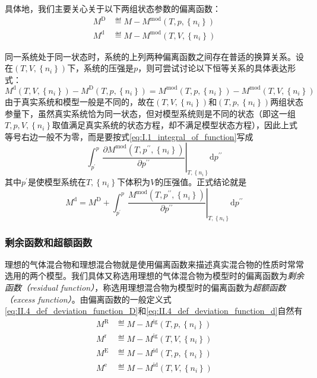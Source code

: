 \documentclass[main.tex]{subfiles}
\begin{document}
具体地，我们主要关心关于以下两组状态参数的偏离函数：
\begin{align}
  M^\text{D} & \eqdef M-M^\text{mod}\left(T,p,\left\{n_i\right\}\right)\label{eq:II.4_def_deviation_function_D} \\
  M^\text{d} & \eqdef M-M^\text{mod}\left(T,V,\left\{n_i\right\}\right)\label{eq:II.4_def_deviation_function_d}
\end{align}

同一系统处于同一状态时，系统的上列两种偏离函数之间存在普适的换算关系。设在$\left(T,V,\left\{n_i\right\}\right)$下，系统的压强是$p$，则可尝试讨论以下恒等关系的具体表达形式：
\[M^\text{d}\left(T,V,\left\{n_i\right\}\right)-M^\text{D}\left(T,p,\left\{n_i\right\}\right)=M^\text{mod}\left(T,p,\left\{n_i\right\}\right)-M^\text{mod}\left(T,V,\left\{n_i\right\}\right)\]
由于真实系统和模型一般是不同的，故在$\left(T,V,\left\{n_i\right\}\right)$和$\left(T,p,\left\{n_i\right\}\right)$两组状态参量下，虽然真实系统恰为同一状态，但对模型系统则是不同的状态（即这一组$T,p,V,\left\{n_i\right\}$取值满足真实系统的状态方程，却不满足模型状态方程），因此上式等号右边一般不为零，而是要按式\eqref{eq:I.1_integral_of_function}写成
\[\int_{p^\prime}^p\left.\frac{\partial M^\text{mod}\left(T,p^{\prime\prime},\left\{n_i\right\}\right)}{\partial p^{\prime\prime}}\right|_{T,\left\{n_i\right\}}\mathrm{d}p^{\prime\prime}\]
其中$p^\prime$是使模型系统在$T,\left\{n_i\right\}$下体积为$V$的压强值。正式结论就是
\begin{equation}\label{eq:II.4_deviation_function_relation}
  M^\text{d}=M^\text{D}+\int_{p^\prime}^p\left.\frac{M^\text{mod}\left(T,p^{\prime\prime},\left\{n_i\right\}\right)}{\partial p^{\prime\prime}}\right|_{T,\left\{n_i\right\}}\mathrm{d}p^{\prime\prime}
\end{equation}

\subsubsection{剩余函数和超额函数}
理想的气体混合物和理想混合物就是使用偏离函数来描述真实混合物的性质时常常选用的两个模型。我们具体又称选用理想的气体混合物为模型时的偏离函数为\emph{剩余函数（residual function）}，称选用理想混合物为模型时的偏离函数为\emph{超额函数（excess function）}。由偏离函数的一般定义式\eqref{eq:II.4_def_deviation_function_D}和\eqref{eq:II.4_def_deviation_function_d}自然有
\begin{align}
  M^\text{R} & \eqdef M-M^\text{ig}\left(T,p,\left\{n_i\right\}\right) \\
  M^\text{r} & \eqdef M-M^\text{ig}\left(T,V,\left\{n_i\right\}\right) \\
  M^\text{E} & \eqdef M-M^\text{id}\left(T,p,\left\{n_i\right\}\right) \\
  M^\text{e} & \eqdef M-M^\text{id}\left(T,V,\left\{n_i\right\}\right)
\end{align}
\end{document}
